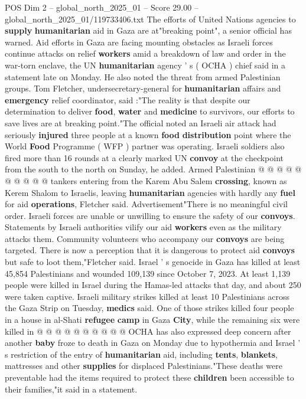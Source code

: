 \begin{textsample}{POS Dim 2 – global\_north\_2025\_01 – Score 29.00 – global\_north\_2025\_01/119733406.txt}  \label{ex:f2_pos_362}
The efforts of United Nations agencies to \textbf{supply} \textbf{humanitarian} aid in Gaza are at"breaking point", a senior official has warned.
Aid efforts in Gaza are facing mounting obstacles as Israeli forces continue attacks on relief \textbf{workers} amid a breakdown of law and order in the war-torn enclave, the UN \textbf{humanitarian} agency ' s ( OCHA ) chief said in a statement late on Monday.
He also noted the threat from armed Palestinian groups.
Tom Fletcher, undersecretary-general for \textbf{humanitarian} affairs and \textbf{emergency} relief coordinator, said :"The reality is that despite our determination to deliver \textbf{food}, \textbf{water} and \textbf{medicine} to survivors, our efforts to save lives are at breaking point."The official noted an Israeli air attack had seriously \textbf{injured} three people at a known \textbf{food} \textbf{distribution} point where the World \textbf{Food} Programme ( WFP ) partner was operating.
Israeli soldiers also fired more than 16 rounds at a clearly marked UN \textbf{convoy} at the checkpoint from the south to the north on Sunday, he added.
Armed Palestinian @ @ @ @ @ @ @ @ @ @ tankers entering from the Karem Abu Salem \textbf{crossing}, known as Kerem Shalom to Israelis, leaving \textbf{humanitarian} agencies with hardly any \textbf{fuel} for aid \textbf{operations}, Fletcher said.
Advertisement"There is no meaningful civil order.
Israeli forces are unable or unwilling to ensure the safety of our \textbf{convoys}.
Statements by Israeli authorities vilify our aid \textbf{workers} even as the military attacks them.
Community volunteers who accompany our \textbf{convoys} are being targeted.
There is now a perception that it is dangerous to protect aid \textbf{convoys} but safe to loot them,"Fletcher said.
Israel ' s genocide in Gaza has killed at least 45,854 Palestinians and wounded 109,139 since October 7, 2023.
At least 1,139 people were killed in Israel during the Hamas-led attacks that day, and about 250 were taken captive.
Israeli military strikes killed at least 10 Palestinians across the Gaza Strip on Tuesday, \textbf{medics} said.
One of those strikes killed four people in a house in al-Shati \textbf{refugee} \textbf{camp} in Gaza \textbf{City}, while the remaining six were killed in @ @ @ @ @ @ @ @ @ @ OCHA has also expressed deep concern after another \textbf{baby} froze to death in Gaza on Monday due to hypothermia and Israel ' s restriction of the entry of \textbf{humanitarian} aid, including \textbf{tents}, \textbf{blankets}, mattresses and other \textbf{supplies} for displaced Palestinians."These deaths were preventable had the items required to protect these \textbf{children} been accessible to their families,"it said in a statement.

\end{textsample}
